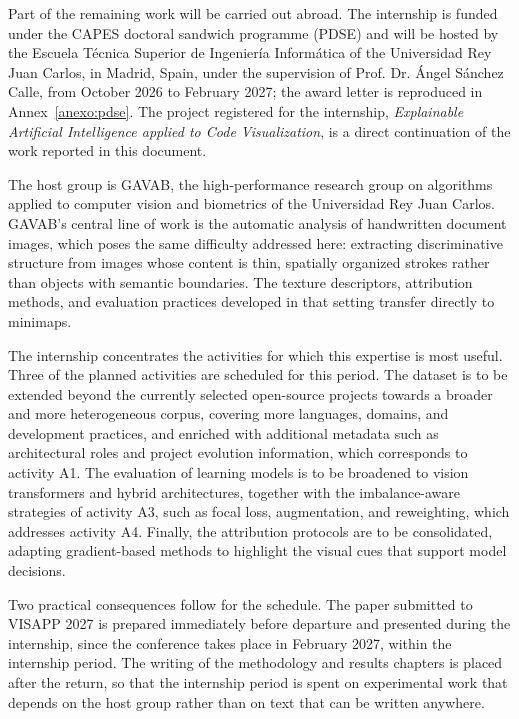 Part of the remaining work will be carried out abroad. The internship is funded
under the CAPES doctoral sandwich programme (PDSE) and will be hosted by the
Escuela T\'ecnica Superior de Ingenier\'ia Inform\'atica of the Universidad Rey
Juan Carlos, in Madrid, Spain, under the supervision of Prof. Dr. \'Angel
S\'anchez Calle, from October 2026 to February 2027; the award letter is
reproduced in Annex~\ref{anexo:pdse}. The project registered for
the internship, \emph{Explainable Artificial Intelligence applied to Code
Visualization}, is a direct continuation of the work reported in this document.

The host group is GAVAB, the high-performance research group on algorithms
applied to computer vision and biometrics of the Universidad Rey Juan Carlos.
GAVAB's central line of work is the automatic analysis of handwritten document
images, which poses the same difficulty addressed here: extracting
discriminative structure from images whose content is thin, spatially organized
strokes rather than objects with semantic boundaries.
The texture descriptors, attribution methods, and evaluation practices developed
in that setting transfer directly to minimaps.

The internship concentrates the activities for which this expertise is most
useful. Three of the planned
activities are scheduled for this period. The dataset is to be extended beyond
the currently selected open-source projects towards a broader and more
heterogeneous corpus, covering more languages, domains, and development
practices, and enriched with additional metadata such as architectural roles and
project evolution information, which corresponds to activity A1. The evaluation
of learning models is to be broadened to vision transformers and hybrid
architectures, together with the imbalance-aware strategies of activity A3, such
as focal loss, augmentation, and reweighting, which addresses activity A4.
Finally, the attribution protocols are to be consolidated, adapting
gradient-based methods to highlight the visual cues that support model
decisions.

Two practical consequences follow for the schedule. The paper submitted to
VISAPP 2027 is prepared immediately before departure and presented during the
internship, since the conference takes place in February 2027, within the
internship period. The writing of the methodology and results chapters is
placed after the return, so that the internship period is spent on
experimental work that depends on the host group rather than on text that can be
written anywhere.

